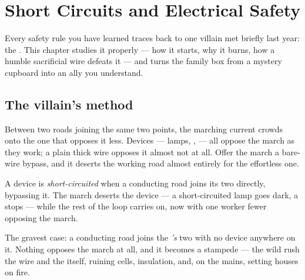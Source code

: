 \chapter{Short Circuits and Electrical Safety}\label{ch:g7:short-circuits-safety}

Every safety rule you have learned traces back to one villain met
briefly last year: the . This chapter studies it
properly --- how it starts, why it burns, how a humble sacrificial
wire defeats it --- and turns the family  box from a mystery
cupboard into an ally you understand.

\section{The villain's method}

\begin{proposition}\label{prop:g7:short-circuits-safety:effortless}
Between two roads joining the same two points, the marching
current crowds onto the one that opposes it less. Devices ---
lamps, ,  --- all oppose the march as they work; a
plain thick wire opposes it almost not at all. Offer the march a
bare-wire bypass, and it deserts the working road almost
entirely for the effortless one.
\end{proposition}

\begin{definition}\label{def:g7:short-circuits-safety:device}
A device is \emph{short-circuited} when a
conducting road joins its two  directly, bypassing it.
The march deserts the device --- a short-circuited lamp goes
dark, a  stops --- while the rest of the loop carries on,
now with one worker fewer opposing the march.
\end{definition}

\begin{definition}\label{def:g7:short-circuits-safety:battery}
The gravest case: a conducting road joins the \emph{'s}
two  with no device anywhere on it. Nothing opposes the
march at all, and it becomes a stampede --- the wild rush 
the wire and the  itself, ruining cells, 
insulation, and, on the mains, setting houses on fire.
\end{definition}

